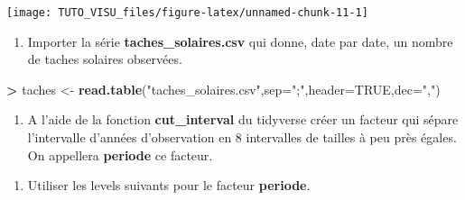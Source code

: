 \documentclass[]{book}
\newenvironment{Shaded}{\begin{snugshade}}{\end{snugshade}}
\newcommand{\DataTypeTok}[1]{\textcolor[rgb]{0.13,0.29,0.53}{#1}}
\newcommand{\DecValTok}[1]{\textcolor[rgb]{0.00,0.00,0.81}{#1}}
\newcommand{\KeywordTok}[1]{\textcolor[rgb]{0.13,0.29,0.53}{\textbf{#1}}}
\newcommand{\NormalTok}[1]{#1}
\newcommand{\OperatorTok}[1]{\textcolor[rgb]{0.81,0.36,0.00}{\textbf{#1}}}
\newcommand{\OtherTok}[1]{\textcolor[rgb]{0.56,0.35,0.01}{#1}}
\newcommand{\StringTok}[1]{\textcolor[rgb]{0.31,0.60,0.02}{#1}}
\providecommand{\tightlist}{%
  \setlength{\itemsep}{0pt}\setlength{\parskip}{0pt}}
\theoremstyle{definition}
\theoremstyle{definition}
\theoremstyle{definition}
\theoremstyle{remark}
\let\BeginKnitrBlock\begin \let\EndKnitrBlock\end
\begin{document}
\begin{center}\texttt{[image: TUTO\_VISU\_files/figure-latex/unnamed-chunk-11-1]} \end{center}

\BeginKnitrBlock{exercise}[Tâches solaires]
\protect\hypertarget{exr:exo3}{}{\label{exr:exo3} \iffalse (Tâches solaires) \fi{} }
\EndKnitrBlock{exercise}

\begin{enumerate}
\def\labelenumi{\arabic{enumi}.}
\tightlist
\item
  Importer la série \textbf{taches\_solaires.csv} qui donne, date par date, un nombre de taches solaires observées.
\end{enumerate}

\begin{Shaded}
\begin{Highlighting}[]
\OperatorTok{>}\StringTok{ }\NormalTok{taches <-}\StringTok{ }\KeywordTok{read.table}\NormalTok{(}\StringTok{"taches_solaires.csv"}\NormalTok{,}\DataTypeTok{sep=}\StringTok{";"}\NormalTok{,}\DataTypeTok{header=}\OtherTok{TRUE}\NormalTok{,}\DataTypeTok{dec=}\StringTok{","}\NormalTok{)}
\end{Highlighting}
\end{Shaded}

\begin{enumerate}
\def\labelenumi{\arabic{enumi}.}
\setcounter{enumi}{1}
\tightlist
\item
  A l'aide de la fonction \textbf{cut\_interval} du tidyverse créer un facteur qui sépare l'intervalle d'années d'observation en 8 intervalles de tailles à peu près égales. On appellera \textbf{periode} ce facteur.
\end{enumerate}

\begin{Shaded}
\end{Shaded}

\begin{enumerate}
\def\labelenumi{\arabic{enumi}.}
\setcounter{enumi}{2}
\tightlist
\item
  Utiliser les levels suivants pour le facteur \textbf{periode}.
\end{enumerate}
\end{document}
